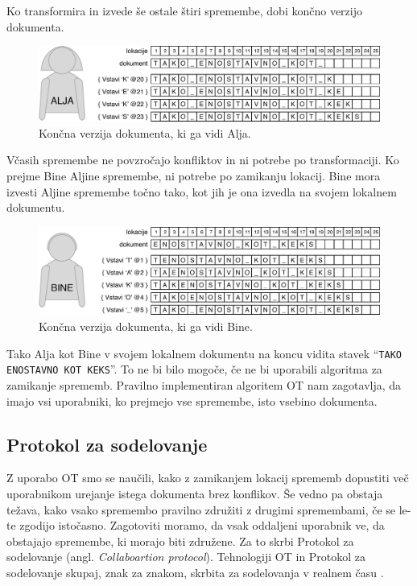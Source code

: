 \documentclass[a4paper, 12pt, twoside]{book}
\begin{document}
Ko transformira in izvede še ostale štiri spremembe, dobi končno verzijo dokumenta.

\begin{figure}[placement h]
\begin{center}
\includegraphics[width=12cm]{img/ot5.pdf}
\end{center}
\caption{Končna verzija dokumenta, ki ga vidi Alja.}
\label{ot5}
\end{figure}

Včasih spremembe ne povzročajo konfliktov in ni potrebe po transformaciji. Ko prejme Bine Aljine spremembe, ni potrebe po zamikanju lokacij. Bine mora izvesti Aljine spremembe točno tako, kot jih je ona izvedla na svojem lokalnem dokumentu.

\begin{figure}[placement h]
\begin{center}
\includegraphics[width=12cm]{img/ot6.pdf}
\end{center}
\caption{Končna verzija dokumenta, ki ga vidi Bine.}
\label{ot6}
\end{figure}

Tako Alja kot Bine v svojem lokalnem dokumentu na koncu vidita stavek “{\tt TAKO ENOSTAVNO KOT KEKS}”. To ne bi bilo mogoče, če ne bi uporabili algoritma za zamikanje sprememb. Pravilno implementiran algoritem OT nam zagotavlja, da imajo vsi uporabniki, ko prejmejo vse spremembe, isto vsebino dokumenta.

\subsection{Protokol za sodelovanje}
\label{subsec:ps}

Z uporabo OT smo se naučili, kako z zamikanjem lokacij sprememb dopustiti več uporabnikom urejanje istega dokumenta brez konflikov. Še vedno pa obstaja težava, kako vsako spremembo pravilno združiti z drugimi spremembami, če se le-te zgodijo istočasno. Zagotoviti moramo, da vsak oddaljeni uporabnik ve, da obstajajo spremembe, ki morajo biti združene. Za to skrbi Protokol za sodelovanje (angl. \textit{Collaboartion protocol}). Tehnologiji OT in Protokol za sodelovanje skupaj, znak za znakom, skrbita za sodelovanja v realnem času \cite{gdocs23}.
\end{document}
